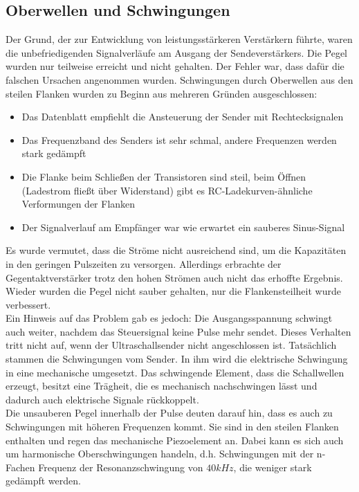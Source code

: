 \subsection{Oberwellen und Schwingungen} %
Der Grund, der zur Entwicklung von leistungsstärkeren Verstärkern führte, waren die unbefriedigenden Signalverläufe am Ausgang der Sendeverstärkers. Die Pegel wurden nur teilweise erreicht und nicht gehalten. Der Fehler war, dass dafür die falschen Ursachen angenommen wurden. Schwingungen durch Oberwellen aus den steilen Flanken wurden zu Beginn aus mehreren Gründen ausgeschlossen:
\begin{itemize}
	\item Das Datenblatt empfiehlt die Ansteuerung der Sender mit Rechtecksignalen
	\item Das Frequenzband des Senders ist sehr schmal, andere Frequenzen werden stark gedämpft
	\item Die Flanke beim Schließen der Transistoren sind steil, beim Öffnen (Ladestrom fließt über Widerstand) gibt es RC-Ladekurven-ähnliche Verformungen der Flanken
	\item Der Signalverlauf am Empfänger war wie erwartet ein sauberes Sinus-Signal
\end{itemize}
Es wurde vermutet, dass die Ströme nicht ausreichend sind, um die Kapazitäten in den geringen Pulszeiten zu versorgen. Allerdings erbrachte der Gegentaktverstärker trotz den hohen Strömen auch nicht das erhoffte Ergebnis. Wieder wurden die Pegel nicht sauber gehalten, nur die Flankensteilheit wurde verbessert.\\
Ein Hinweis auf das Problem gab es jedoch: Die Ausgangsspannung schwingt auch weiter, nachdem das Steuersignal keine Pulse mehr sendet. Dieses Verhalten tritt nicht auf, wenn der Ultraschallsender nicht angeschlossen ist. Tatsächlich stammen die Schwingungen vom Sender. In ihm wird die elektrische Schwingung in eine mechanische umgesetzt. Das schwingende Element, dass die Schallwellen erzeugt, besitzt eine Trägheit, die es mechanisch nachschwingen lässt und dadurch auch elektrische Signale rückkoppelt.\\ %
Die unsauberen Pegel innerhalb der Pulse deuten darauf hin, dass es auch zu Schwingungen mit höheren Frequenzen kommt. Sie sind in den steilen Flanken enthalten und regen das mechanische Piezoelement an. Dabei kann es sich auch um harmonische Oberschwingungen handeln, d.h. Schwingungen mit der n-Fachen Frequenz der Resonanzschwingung von $40 kHz$, die weniger stark gedämpft werden.
